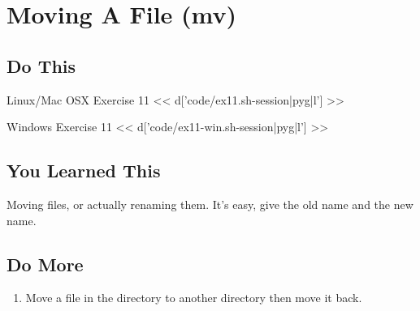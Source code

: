 \chapter{Moving A File (mv)}

\section{Do This}

\begin{code}{Linux/Mac OSX Exercise 11}
<< d['code/ex11.sh-session|pyg|l'] >>
\end{code}

\begin{code}{Windows Exercise 11}
<< d['code/ex11-win.sh-session|pyg|l'] >>
\end{code}

\section{You Learned This}

Moving files, or actually renaming them.  It's easy, give the old name and
the new name.

\section{Do More}

\begin{enumerate}
\item Move a file in the  directory to another directory
    then move it back.
\end{enumerate}


